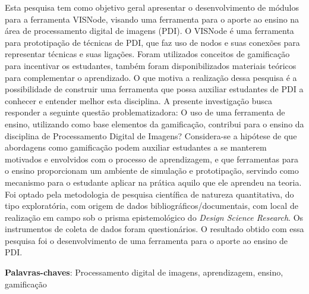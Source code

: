 \documentclass[
	12pt,				%
	oneside,			%
	a4paper,			%
	english,			%
	french,				%
	spanish,			%
	brazil,				%
	]{abntex2}
\begin{document}
\frenchspacing 


\imprimircapa
\imprimirfolhaderosto



\begin{resumo}
Esta pesquisa tem como objetivo geral apresentar o desenvolvimento de módulos para a ferramenta VISNode, visando  uma ferramenta para o aporte ao ensino na área de processamento digital de imagens (PDI). O VISNode é uma ferramenta para prototipação de técnicas de PDI, que faz uso de nodos e suas conexões para representar técnicas e suas ligações. Foram utilizados conceitos de gamificação para incentivar os estudantes, também foram disponibilizados materiais teóricos para complementar o aprendizado.  O que motiva a realização dessa pesquisa é a possibilidade de construir uma ferramenta que possa auxiliar estudantes de PDI a conhecer e entender melhor esta disciplina. A presente investigação busca responder a seguinte questão problematizadora: O uso de uma ferramenta de ensino, utilizando como base elementos da gamificação, contribui para o ensino da disciplina de Processamento Digital de Imagens? Considera-se a hipótese de que abordagens como gamificação podem auxiliar estudantes a se manterem motivados e envolvidos com o processo de aprendizagem, e que ferramentas para o ensino proporcionam um ambiente de simulação e prototipação, servindo como mecanismo para o estudante aplicar na prática aquilo que ele aprendeu na teoria. Foi optado pela metodologia de pesquisa científica de natureza quantitativa, do tipo exploratória, com origem de dados bibliográficos/documentais, com local de realização em campo sob o prisma epistemológico do \textit{Design Science Research}. Os instrumentos de coleta de dados foram questionários. O resultado obtido com essa pesquisa foi o desenvolvimento de uma ferramenta para o aporte ao ensino de PDI.

 \vspace{\onelineskip}
    
 \noindent
 \textbf{Palavras-chaves}: Processamento digital de imagens, aprendizagem, ensino, gamificação
\end{resumo}
\end{document}

